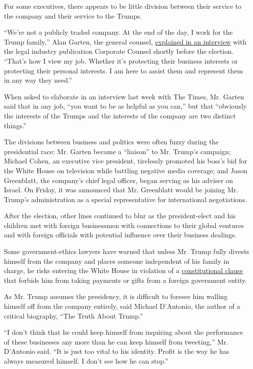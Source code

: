 For some executives, there appears to be little division between their
service to the company and their service to the Trumps.

``We're not a publicly traded company. At the end of the day, I work for
the Trump family,'' Alan Garten, the general counsel,
\href{http://www.corpcounsel.com/id=1202771661378/Trumps-GC-Donald-is-a-Demanding-but-Fair-Boss}{explained
in an interview} with the legal industry publication Corporate Counsel
shortly before the election. ``That's how I view my job. Whether it's
protecting their business interests or protecting their personal
interests. I am here to assist them and represent them in any way they
need.''

When asked to elaborate in an interview last week with The Times, Mr.
Garten said that in any job, ``you want to be as helpful as you can,''
but that ``obviously the interests of the Trumps and the interests of
the company are two distinct things.''

The divisions between business and politics were often fuzzy during the
presidential race: Mr. Garten became a ``liaison'' to Mr. Trump's
campaign; Michael Cohen, an executive vice president, tirelessly
promoted his boss's bid for the White House on television while battling
negative media coverage; and Jason Greenblatt, the company's chief legal
officer, began serving as his adviser on Israel. On Friday, it was
announced that Mr. Greenblatt would be joining Mr. Trump's
administration as a special representative for international
negotiations.

After the election, other lines continued to blur as the president-elect
and his children met with foreign businessmen with connections to their
global ventures and with foreign officials with potential influence over
their business dealings.

Some government-ethics lawyers have warned that unless Mr. Trump fully
divests himself from the company and places someone independent of his
family in charge, he risks entering the White House in violation of a
\href{https://www.nytimes.com/2016/11/21/us/politics/donald-trump-conflict-of-interest.html}{constitutional
clause} that forbids him from taking payments or gifts from a foreign
government entity.

As Mr. Trump assumes the presidency, it is difficult to foresee him
walling himself off from the company entirely, said Michael D'Antonio,
the author of a critical biography, ``The Truth About Trump.''

``I don't think that he could keep himself from inquiring about the
performance of these businesses any more than he can keep himself from
tweeting,'' Mr. D'Antonio said. ``It is just too vital to his identity.
Profit is the way he has always measured himself. I don't see how he can
stop.''

